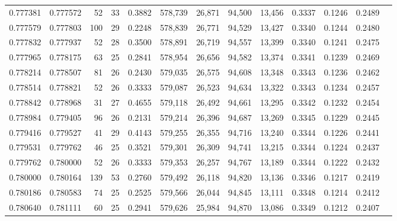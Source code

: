 \begin{tabular}{rrrrrrrrrrrrr}
0.777381 & 0.777572 &     52 &    33 &                                     0.3882 & 578,739 &  26,871 &  94,500 &  13,456 & 0.3337 & 0.1246 & 0.2489 \\
0.777579 & 0.777803 &    100 &    29 &                                     0.2248 & 578,839 &  26,771 &  94,529 &  13,427 & 0.3340 & 0.1244 & 0.2480 \\
0.777832 & 0.777937 &     52 &    28 &                                     0.3500 & 578,891 &  26,719 &  94,557 &  13,399 & 0.3340 & 0.1241 & 0.2475 \\
0.777965 & 0.778175 &     63 &    25 &                                     0.2841 & 578,954 &  26,656 &  94,582 &  13,374 & 0.3341 & 0.1239 & 0.2469 \\
0.778214 & 0.778507 &     81 &    26 &                                     0.2430 & 579,035 &  26,575 &  94,608 &  13,348 & 0.3343 & 0.1236 & 0.2462 \\
0.778514 & 0.778821 &     52 &    26 &                                     0.3333 & 579,087 &  26,523 &  94,634 &  13,322 & 0.3343 & 0.1234 & 0.2457 \\
0.778842 & 0.778968 &     31 &    27 &                                     0.4655 & 579,118 &  26,492 &  94,661 &  13,295 & 0.3342 & 0.1232 & 0.2454 \\
0.778984 & 0.779405 &     96 &    26 &                                     0.2131 & 579,214 &  26,396 &  94,687 &  13,269 & 0.3345 & 0.1229 & 0.2445 \\
0.779416 & 0.779527 &     41 &    29 &                                     0.4143 & 579,255 &  26,355 &  94,716 &  13,240 & 0.3344 & 0.1226 & 0.2441 \\
0.779531 & 0.779762 &     46 &    25 &                                     0.3521 & 579,301 &  26,309 &  94,741 &  13,215 & 0.3344 & 0.1224 & 0.2437 \\
0.779762 & 0.780000 &     52 &    26 &                                     0.3333 & 579,353 &  26,257 &  94,767 &  13,189 & 0.3344 & 0.1222 & 0.2432 \\
0.780000 & 0.780164 &    139 &    53 &                                     0.2760 & 579,492 &  26,118 &  94,820 &  13,136 & 0.3346 & 0.1217 & 0.2419 \\
0.780186 & 0.780583 &     74 &    25 &                                     0.2525 & 579,566 &  26,044 &  94,845 &  13,111 & 0.3348 & 0.1214 & 0.2412 \\
0.780640 & 0.781111 &     60 &    25 &                                     0.2941 & 579,626 &  25,984 &  94,870 &  13,086 & 0.3349 & 0.1212 & 0.2407 \\

\end{tabular}
